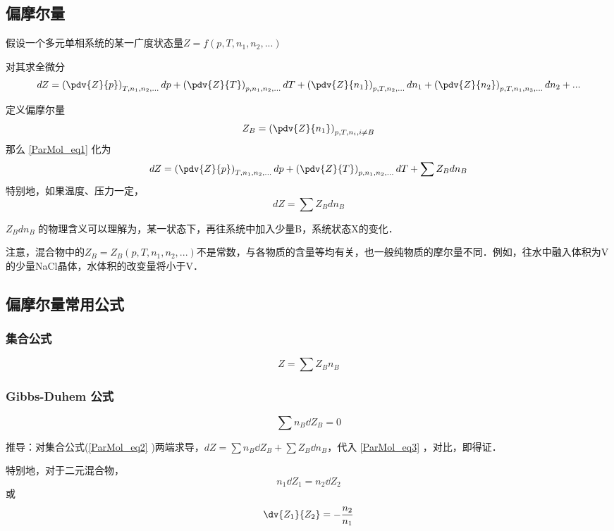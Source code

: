 \subsection{偏摩尔量}
假设一个多元单相系统的某一广度状态量$Z=f(p,T,n_1,n_2,...)$

对其求全微分
\begin{equation}\label{ParMol_eq1}
dZ = \left(\pdv{Z}{p}\right)_{T,n_1,n_2,...}dp + \left(\pdv{Z}{T}\right)_{p,n_1,n_2,...}dT+\left(\pdv{Z}{n_1}\right)_{p,T,n_2,...}dn_1+\left(\pdv{Z}{n_2}\right)_{p,T,n_1,n_3,...}dn_2+...
\end{equation}

定义偏摩尔量
\begin{equation}
{Z_B} = \left(\pdv{Z}{n_1}\right)_{p,T,n_i, i \neq B} 
\end{equation}
那么 \autoref{ParMol_eq1} 化为 
\begin{equation}
dZ = \left(\pdv{Z}{p}\right)_{T,n_1,n_2,...}dp + \left(\pdv{Z}{T}\right)_{p,n_1,n_2,...}dT+\sum {Z_B} dn_B
\end{equation}
特别地，如果温度、压力一定，
\begin{equation}\label{ParMol_eq3}
dZ = \sum {Z_B} dn_B
\end{equation}

${Z_B} d n_B$ 的物理含义可以理解为，某一状态下，再往系统中加入少量B，系统状态X的变化．

注意，混合物中的${Z_B}={Z_B}(p,T,n_1,n_2,...)$不是常数，与各物质的含量等均有关，也一般纯物质的摩尔量不同．例如，往水中融入体积为V的少量NaCl晶体，水体积的改变量将小于V．

\subsection{偏摩尔量常用公式}
\subsubsection{集合公式}
\begin{equation}\label{ParMol_eq2}
Z=\sum {Z_B}  n_B
\end{equation}
\subsubsection{Gibbs-Duhem 公式}
\begin{equation}
\sum n_B \dd Z_B = 0
\end{equation}

推导：对集合公式(\autoref{ParMol_eq2} )两端求导，$dZ=\sum n_B \dd Z_B + \sum {Z_B}  \dd n_B$，代入 \autoref{ParMol_eq3} ，对比，即得证．

特别地，对于二元混合物，
\begin{equation}
n_1 \dd {Z_1} = n_2 \dd {Z_2}
\end{equation}
或
\begin{equation}
\dv{Z_1}{Z_2}=-\frac{n_2}{n_1}
\end{equation}

